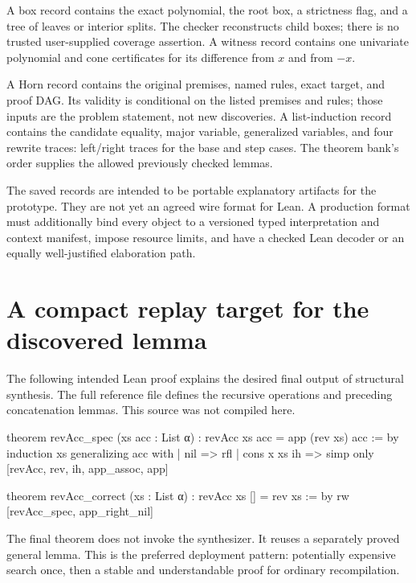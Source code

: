 \documentclass[11pt,a4paper]{article}
\begin{document}
A box record contains the exact polynomial, the root box, a strictness flag,
and a tree of leaves or interior splits. The checker reconstructs child boxes;
there is no trusted user-supplied coverage assertion. A witness record contains
one univariate polynomial and cone certificates for its difference from $x$
and from $-x$.

A Horn record contains the original premises, named rules, exact target, and
proof DAG. Its validity is conditional on the listed premises and rules; those
inputs are the problem statement, not new discoveries. A list-induction record
contains the candidate equality, major variable, generalized variables, and
four rewrite traces: left/right traces for the base and step cases. The theorem
bank's order supplies the allowed previously checked lemmas.

The saved records are intended to be portable explanatory artifacts for the
prototype. They are not yet an agreed wire format for Lean. A production format
must additionally bind every object to a versioned typed interpretation and
context manifest, impose resource limits, and have a checked Lean decoder or
an equally well-justified elaboration path.

\section{A compact replay target for the discovered lemma}
The following intended Lean proof explains the desired final output of
structural synthesis. The full reference file defines the recursive operations
and preceding concatenation lemmas. This source was not compiled here.
\begin{Code}
theorem revAcc_spec (xs acc : List α) :
    revAcc xs acc = app (rev xs) acc := by
  induction xs generalizing acc with
  | nil => rfl
  | cons x xs ih =>
    simp only [revAcc, rev, ih, app_assoc, app]

theorem revAcc_correct (xs : List α) :
    revAcc xs [] = rev xs := by
  rw [revAcc_spec, app_right_nil]
\end{Code}
The final theorem does not invoke the synthesizer. It reuses a separately
proved general lemma. This is the preferred deployment pattern: potentially
expensive search once, then a stable and understandable proof for ordinary
recompilation.
\end{document}
